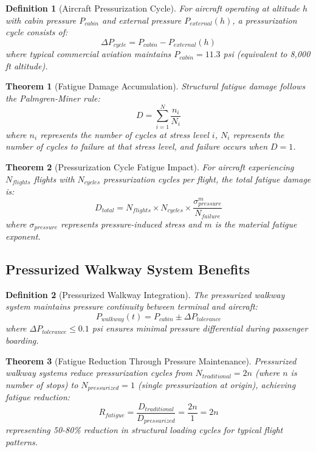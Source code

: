 \documentclass[12pt,a4paper]{article}
\newtheorem{theorem}{Theorem}
\newtheorem{definition}{Definition}
\begin{document}
\begin{definition}[Aircraft Pressurization Cycle]
For aircraft operating at altitude $h$ with cabin pressure $P_{cabin}$ and external pressure $P_{external}(h)$, a pressurization cycle consists of:
\begin{equation}
\Delta P_{cycle} = P_{cabin} - P_{external}(h)
\end{equation}
where typical commercial aviation maintains $P_{cabin} = 11.3$ psi (equivalent to 8,000 ft altitude).
\end{definition}

\begin{theorem}[Fatigue Damage Accumulation]
Structural fatigue damage follows the Palmgren-Miner rule:
\begin{equation}
D = \sum_{i=1}^{N} \frac{n_i}{N_i}
\end{equation}
where $n_i$ represents the number of cycles at stress level $i$, $N_i$ represents the number of cycles to failure at that stress level, and failure occurs when $D = 1$.
\end{theorem}

\begin{theorem}[Pressurization Cycle Fatigue Impact]
For aircraft experiencing $N_{flights}$ flights with $N_{cycles}$ pressurization cycles per flight, the total fatigue damage is:
\begin{equation}
D_{total} = N_{flights} \times N_{cycles} \times \frac{\sigma_{pressure}^m}{N_{failure}}
\end{equation}
where $\sigma_{pressure}$ represents pressure-induced stress and $m$ is the material fatigue exponent.
\end{theorem}

\subsection{Pressurized Walkway System Benefits}

\begin{definition}[Pressurized Walkway Integration]
The pressurized walkway system maintains pressure continuity between terminal and aircraft:
\begin{equation}
P_{walkway}(t) = P_{cabin} \pm \Delta P_{tolerance}
\end{equation}
where $\Delta P_{tolerance} \leq 0.1$ psi ensures minimal pressure differential during passenger boarding.
\end{definition}

\begin{theorem}[Fatigue Reduction Through Pressure Maintenance]
Pressurized walkway systems reduce pressurization cycles from $N_{traditional} = 2n$ (where $n$ is number of stops) to $N_{pressurized} = 1$ (single pressurization at origin), achieving fatigue reduction:
\begin{equation}
R_{fatigue} = \frac{D_{traditional}}{D_{pressurized}} = \frac{2n}{1} = 2n
\end{equation}
representing 50-80\% reduction in structural loading cycles for typical flight patterns.
\end{theorem}
\end{document}
